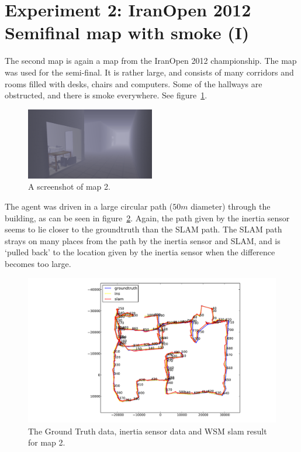 \section{Experiment 2: IranOpen 2012 Semifinal map with smoke (I)}
The second map is again a map from the IranOpen 2012 championship. The map was used for the semi-final. It is rather large, and consists of many corridors and rooms filled with desks, chairs and computers. Some of the hallways are obstructed, and there is smoke everywhere. See figure~\ref{fig:map3-screenshot}.

\begin{figure}[ht]
\centering
  \includegraphics[width=0.5\textwidth]{images/experiment/map3/map3.png}
  \caption{A screenshot of map 2.}
  \label{fig:map3-screenshot}
\end{figure}

The agent was driven in a large circular path ($50m$ diameter) through the building, as can be seen in figure~\ref{fig:map3-trace}. Again, the path given by the inertia sensor seems to lie closer to the groundtruth than the SLAM path. The SLAM path strays on many places from the path by the inertia sensor and SLAM, and is `pulled back' to the location given by the inertia sensor when the difference becomes too large.

\begin{figure}[ht]
\centering
  \includegraphics[width=\textwidth]{images/experiment/map3/trace2.pdf}
  \caption{The Ground Truth data, inertia sensor data and WSM slam result for map 2.}
  \label{fig:map3-trace}
\end{figure}

